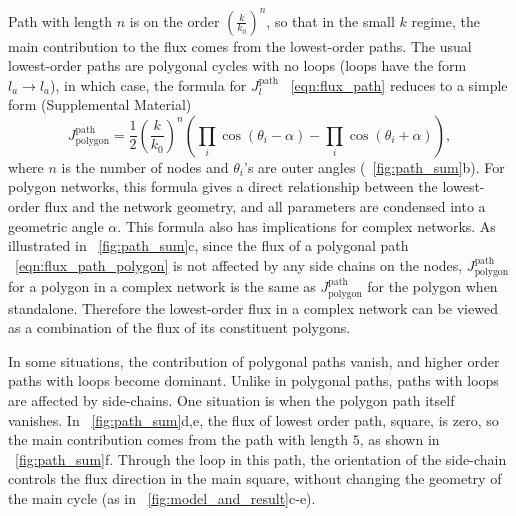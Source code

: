 \documentclass[
 preprint,
 preprintnumbers,
 amsmath,amssymb,
 aps,
 pre,
 longbibliography,
 10pt, twocolumn
]{revtex4-1}
\begin{document}
Path with length $n$ is on the order $(\frac{k}{k_0})^n$, so that in the small $k$ regime, the main contribution to the flux comes from the lowest-order paths. 
The usual lowest-order paths are polygonal cycles with no loops (loops have the form $l_a\rightarrow l_a$), in which case, the formula for $J^\text{path}_l$ \eqnname~\eqref{eqn:flux_path} reduces to a simple form (Supplemental Material)
\begin{equation} \label{eqn:flux_path_polygon}
    J^\text{path}_\text{polygon} = \frac{1}{2} (\frac{k}{k_0})^n (\prod_i \cos(\theta_i - \alpha) - \prod_i \cos(\theta_i + \alpha)),
\end{equation}
where $n$ is the number of nodes and $\theta_i$'s are outer angles (\figurename~\ref{fig:path_sum}b).
For polygon networks, this formula gives a direct relationship between the lowest-order flux and the network geometry, and all parameters are condensed into a geometric angle $\alpha$. 
This formula also has implications for complex networks. As illustrated in \figurename~\ref{fig:path_sum}c, since the flux of a polygonal path \eqnname~\eqref{eqn:flux_path_polygon} is not affected by any side chains on the nodes, $J^\text{path}_\text{polygon}$ for a polygon in a complex network is the same as $J^\text{path}_\text{polygon}$ for the polygon when standalone. Therefore the lowest-order flux in a complex network can be viewed as a combination of the flux of its constituent polygons.

In some situations, the contribution of polygonal paths vanish, and higher order paths with loops become dominant. Unlike in polygonal paths, paths with loops are affected by side-chains.
One situation is when the polygon path itself vanishes. In \figurename~\ref{fig:path_sum}d,e, the flux of lowest order path, square, is zero, so the main contribution comes from the path with length $5$, as shown in \figurename~\ref{fig:path_sum}f. Through the loop in this path, the orientation of the side-chain controls the flux direction in the main square, without changing the geometry of the main cycle (as in \figurename~\ref{fig:model_and_result}c-e).
\end{document}
